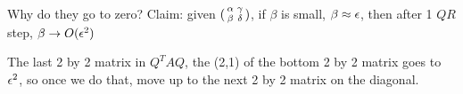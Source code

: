 Why do they go to zero? Claim: given
$(
\begin{smallmatrix}
  \alpha & \gamma \\ \beta & \delta
\end{smallmatrix})
$, if $\beta$ is small, $\beta\approx \epsilon$, then after 1 $QR$ step,
$\beta \rightarrow O(\epsilon^2)$

The last 2 by 2 matrix in $Q^TAQ$, the (2,1)  of the bottom 2 by 2
matrix goes to $\epsilon^2$, so once we do that, move up to the next 2 by
2 matrix on the diagonal.



